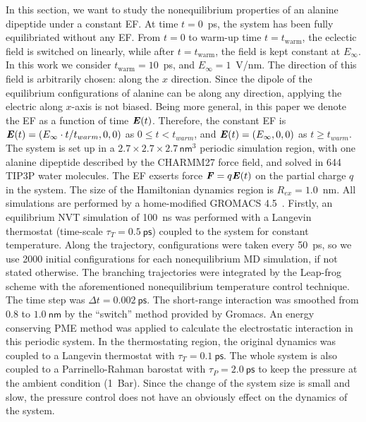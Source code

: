 \documentclass[a4paper,preprint,unsortedaddress,onecolumn]{revtex4-1}
\newcommand{\vect}[1]{\textbf{\textit{#1}}}
\begin{document}
In this section,
we want to study the nonequilibrium properties of an alanine dipeptide
under a constant EF.  At time $t=0$~ps, the system
has been fully equilibriated without any EF. From $t=0$ to
warm-up time $t=t_{\textrm{warm}}$, the eclectic field is switched on linearly, while
after $t=t_{\textrm{warm}}$, the field is kept constant at
$E_{\infty}$.  In this work we consider $t_{\textrm{warm}} = 10$~ps,
and $E_{\infty} = 1$~V/nm.
The direction of this field is arbitrarily chosen: along the
$x$ direction. Since the dipole of the equilibrium configurations of
alanine can be along any direction, applying the electric along $x$-axis is
not biased.
Being more general, in this paper we denote the
EF as a function of time $\vect E(t)$.
Therefore, the constant EF is
$\vect E(t) = (E_\infty\cdot t/t_{warm},0,0)$ as $0\leq t < t_{warm}$, and 
$\vect E(t) = (E_\infty,0,0)$
as $t \geq t_{warm}$.
The system is set up in a $2.7\times 2.7\times
2.7\, \textsf{nm}^3$ periodic simulation region, with one alanine dipeptide
described by the CHARMM27 force field, and solved in 644 TIP3P
water molecules.
The EF exserts force $\vect F = q \vect E(t)$ on
the partial charge $q$ in the system.
The size of the  Hamiltonian dynamics region is $R_{ex} = 1.0$~nm.
All simulations are performed by a home-modified GROMACS 4.5~\cite{pronk2013gromacs}.
Firstly, an equilibrium NVT simulation of
100~\textsf{ns} was performed with a Langevin thermostat (time-scale
$\tau_T = 0.5~\textsf{ps}$) coupled to the system for constant
temperature.  Along the trajectory, configurations were taken every
50~\textsf{ps}, so we use 2000 initial configurations for each nonequilibrium
MD simulation, if not stated otherwise.
The branching trajectories were integrated by the
Leap-frog scheme with the aforementioned nonequilibrium
temperature control technique.  The
time step was $\Delta t = 0.002~\textsf{ps}$. The short-range
interaction was smoothed from $0.8$ to $1.0~\textsf{nm}$ by the
``switch'' method provided by Gromacs.  An energy conserving PME
method was applied to calculate the electrostatic interaction in this
periodic system. In the thermostating region, the original dynamics was
coupled to a Langevin thermostat with $\tau_T = 0.1~\textsf{ps}$.
The whole system is also coupled to a Parrinello-Rahman barostat with $\tau_P = 2.0~\textsf{ps}$ to keep
the pressure at the ambient condition (1~Bar). Since the
change of the system size is small and slow, the pressure control
does not have an obviously effect on the
dynamics of the system.
\end{document}
